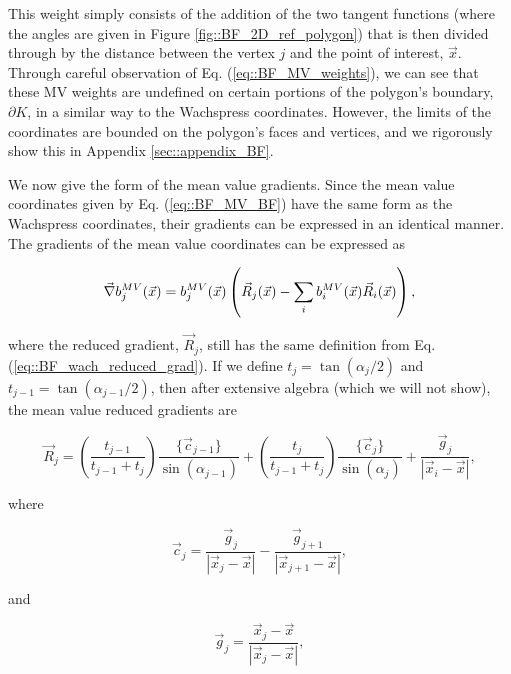 \noindent This weight simply consists of the addition of the two tangent functions (where the angles are given in Figure \ref{fig::BF_2D_ref_polygon}) that is then divided through by the distance between the vertex $j$ and the point of interest, $\vec{x}$. Through careful observation of Eq. (\ref{eq::BF_MV_weights}), we can see that these MV weights are undefined on certain portions of the polygon's boundary, $\partial K$, in a similar way to the Wachspress coordinates. However, the limits of the coordinates are bounded on the polygon's faces and vertices, and we rigorously show this in Appendix \ref{sec::appendix_BF}.

We now give the form of the mean value gradients. Since the mean value coordinates given by Eq. (\ref{eq::BF_MV_BF}) have the same form as the Wachspress coordinates, their gradients can be expressed in an identical manner. The gradients of the mean value coordinates can be expressed as

\begin{equation}
\label{eq::BF_mv_gradient}
\vec{\nabla} b_{j}^{MV}(\vec{x}) = b_{j}^{MV} (\vec{x}) \left( \vec{R}_j  (\vec{x})- \sum\displaylimits_{i}   b_{i}^{MV} (\vec{x}) \vec{R}_i (\vec{x}) \right) ,
\end{equation}

\noindent where the reduced gradient, $\vec{R}_j $, still has the same definition from Eq. (\ref{eq::BF_wach_reduced_grad}). If we define $t_j=\tan(\alpha_j/2)$ and $t_{j-1}=\tan(\alpha_{j-1}/2)$, then after extensive algebra (which we will not show), the mean value reduced gradients are

\begin{equation}
\label{eq::BF_mv_red_grad_form}
\vec{R}_j  = \left( \frac{t_{j-1}}{t_{j-1} + t_{j}} \right) \frac{\{  \vec{c}_{j-1} \}}{\sin (  \alpha_{j-1} )} +  \left( \frac{t_{j}}{t_{j-1} + t_{j}} \right) \frac{\{  \vec{c}_{j} \}}{\sin (  \alpha_{j} )}+ \frac{\vec{g}_j}{|\vec{x}_i - \vec{x}|},
\end{equation}

\noindent where

\begin{equation}
\label{eq::BF_mv_red_cval}
\vec{c}_j = \frac{\vec{g}_{j}}{|\vec{x}_j - \vec{x}|} - \frac{\vec{g}_{j+1}}{|\vec{x}_{j+1} - \vec{x}|},
\end{equation}

\noindent and

\begin{equation}
\label{eq::BF_mv_red_gval}
\vec{g}_j = \frac{\vec{x}_j - \vec{x}}{|\vec{x}_j - \vec{x}|},
\end{equation}

